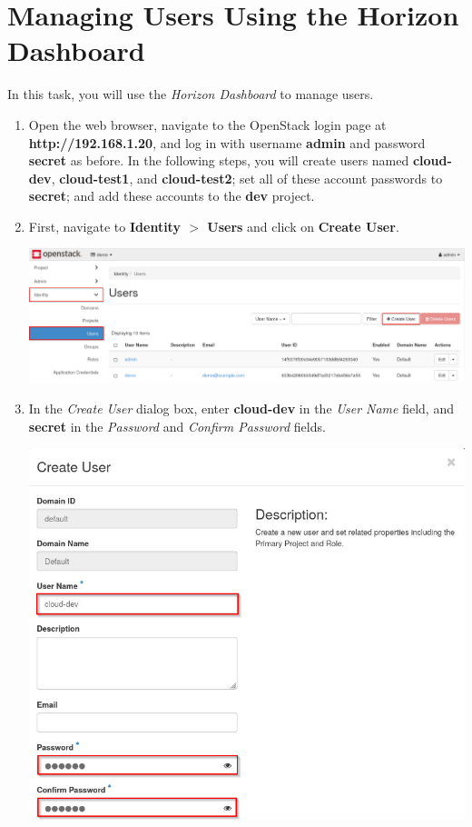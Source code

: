 \documentclass[letterpaper, 12pt]{article}
\begin{document}
\section{Managing Users Using the Horizon Dashboard}
\label{sec:managing_users_using_the_horizon_dashboard}
In this task, you will use the \textit{Horizon Dashboard} to manage users.

\begin{enumerate}
    \item Open the web browser, navigate to the OpenStack login page at \textbf{http://192.168.1.20}, and log in with
    username \textbf{admin} and password \textbf{secret} as before. In the following steps, you will create users named
    \textbf{cloud-dev}, \textbf{cloud-test1}, and \textbf{cloud-test2}; set all of these account passwords to
    \textbf{secret}; and add these accounts to the \textbf{dev} project. 

    \item First, navigate to \textbf{Identity $>$ Users} and click on \textbf{Create User}.

    \begin{center}
        \includegraphics[width=\linewidth]{images/part3/step2.png}
    \end{center}
    
    \item In the \textit{Create User} dialog box, enter \textbf{cloud-dev} in the \textit{User Name} field, and
    \textbf{secret} in the \textit{Password} and \textit{Confirm Password} fields.

    \begin{center}
        \includegraphics[width=\linewidth]{images/part3/step3.png}
    \end{center}


\end{enumerate}
\end{document}
